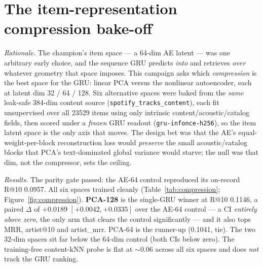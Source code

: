 \documentclass[11pt]{article}
\newcommand{\dsid}[1]{\texttt{\small #1}}
\begin{document}
\section{The item-representation compression bake-off}
\label{sec:compression}
\emph{Rationale.} The champion's item space --- a 64-dim AE latent --- was one
arbitrary early choice, and the sequence GRU predicts \emph{into} and retrieves
\emph{over} whatever geometry that space imposes. This campaign asks which
\emph{compression} is the best space for the GRU: linear PCA versus the
nonlinear autoencoder, each at latent dim 32 / 64 / 128. Six alternative spaces
were baked from the \emph{same} leak-safe 384-dim content source
(\dsid{spotify\_tracks\_content}), each fit unsupervised over all \num{23529}
items using only intrinsic content/acoustic/catalog fields, then scored under a
\emph{frozen} GRU readout (\texttt{gru-infonce-h256}), so the item latent space
is the only axis that moves. The design bet was that the AE's
equal-weight-per-block reconstruction loss would \emph{preserve} the small
acoustic/catalog blocks that PCA's text-dominated global variance would starve;
the null was that dim, not the compressor, sets the ceiling.

\emph{Results.} The parity gate passed: the AE-64 control reproduced its
on-record R@10 \num{0.0957}. All six spaces trained cleanly
(Table~\ref{tab:compression}; Figure~\ref{fig:compression}). \textbf{PCA-128} is
the single-GRU winner at R@10 \num{0.1146}, a paired $\Delta$ of $+\num{0.0189}$
$[+0.0042, +0.0335]$ over the AE-64 control --- a CI \emph{entirely above zero},
the only arm that clears the control significantly --- and it also tops MRR,
artist@10 and artist\_mrr. PCA-64 is the runner-up (\num{0.1041}, tie). The two
32-dim spaces sit far below the 64-dim control (both CIs below zero). The
training-free content-kNN probe is flat at $\sim$0.06 across all six spaces and
does \emph{not} track the GRU ranking.
\end{document}
